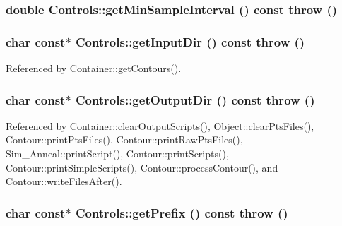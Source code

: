 \hypertarget{classControls_bafd5f43ca67322425ef272c2f91542d}{
\subsubsection[getMinSampleInterval]{\setlength{\rightskip}{0pt plus 5cm}double Controls::getMinSampleInterval () const  throw ()}}
\label{classControls_bafd5f43ca67322425ef272c2f91542d}


\hypertarget{classControls_a81627abb77cefffc5e08c0bd1d2ae8d}{
\subsubsection[getInputDir]{\setlength{\rightskip}{0pt plus 5cm}char const$\ast$ Controls::getInputDir () const  throw ()}}
\label{classControls_a81627abb77cefffc5e08c0bd1d2ae8d}




Referenced by Container::getContours().\hypertarget{classControls_fa588b8bd920e905787ea6965cc57c91}{
\subsubsection[getOutputDir]{\setlength{\rightskip}{0pt plus 5cm}char const$\ast$ Controls::getOutputDir () const  throw ()}}
\label{classControls_fa588b8bd920e905787ea6965cc57c91}




Referenced by Container::clearOutputScripts(), Object::clearPtsFiles(), Contour::printPtsFiles(), Contour::printRawPtsFiles(), Sim\_\-Anneal::printScript(), Contour::printScripts(), Contour::printSimpleScripts(), Contour::processContour(), and Contour::writeFilesAfter().\hypertarget{classControls_441d81822ecacabee389d0c042775b96}{
\subsubsection[getPrefix]{\setlength{\rightskip}{0pt plus 5cm}char const$\ast$ Controls::getPrefix () const  throw ()}}
\label{classControls_441d81822ecacabee389d0c042775b96}




